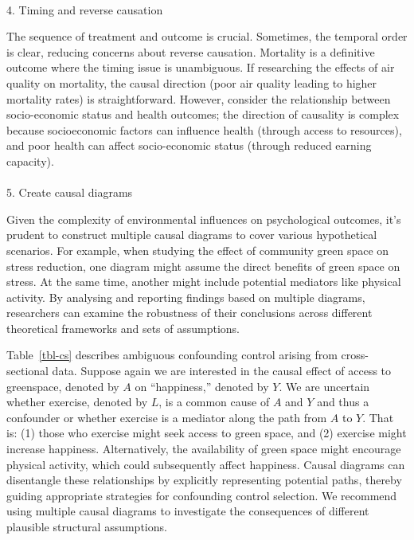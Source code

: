 \documentclass[
  single column]{article}
\makeatletter
\let\oldparagraph\paragraph
\renewcommand{\paragraph}{
    \@ifstar
      \xxxParagraphStar
      \xxxParagraphNoStar
  }
\newcommand{\xxxParagraphStar}[1]{\oldparagraph*{#1}\mbox{}}
\newcommand{\xxxParagraphNoStar}[1]{\oldparagraph{#1}\mbox{}}
\makeatother
\begin{document}
\paragraph{4. Timing and reverse
causation}\label{timing-and-reverse-causation}

The sequence of treatment and outcome is crucial. Sometimes, the
temporal order is clear, reducing concerns about reverse causation.
Mortality is a definitive outcome where the timing issue is unambiguous.
If researching the effects of air quality on mortality, the causal
direction (poor air quality leading to higher mortality rates) is
straightforward. However, consider the relationship between
socio-economic status and health outcomes; the direction of causality is
complex because socioeconomic factors can influence health (through
access to resources), and poor health can affect socio-economic status
(through reduced earning capacity).

\paragraph{5. Create causal diagrams}\label{create-causal-diagrams}

Given the complexity of environmental influences on psychological
outcomes, it's prudent to construct multiple causal diagrams to cover
various hypothetical scenarios. For example, when studying the effect of
community green space on stress reduction, one diagram might assume the
direct benefits of green space on stress. At the same time, another
might include potential mediators like physical activity. By analysing
and reporting findings based on multiple diagrams, researchers can
examine the robustness of their conclusions across different theoretical
frameworks and sets of assumptions.

Table~\ref{tbl-cs} describes ambiguous confounding control arising from
cross-sectional data. Suppose again we are interested in the causal
effect of access to greenspace, denoted by \(A\) on ``happiness,''
denoted by \(Y\). We are uncertain whether exercise, denoted by \(L\),
is a common cause of \(A\) and \(Y\) and thus a confounder or whether
exercise is a mediator along the path from \(A\) to \(Y\). That is: (1)
those who exercise might seek access to green space, and (2) exercise
might increase happiness. Alternatively, the availability of green space
might encourage physical activity, which could subsequently affect
happiness. Causal diagrams can disentangle these relationships by
explicitly representing potential paths, thereby guiding appropriate
strategies for confounding control selection. We recommend using
multiple causal diagrams to investigate the consequences of different
plausible structural assumptions.
\end{document}
